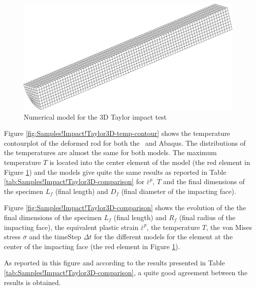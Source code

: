\begin{figure}[h]
\begin{centering}
\includegraphics[width=0.5\columnwidth]{Figures/Samples/Impact/Taylor-3D_mesh}
\par\end{centering}
\caption{Numerical model for the 3D Taylor impact test\label{fig:Samples!Impact!Taylor3D}}
\end{figure}

Figure \ref{fig:Samples!Impact!Taylor3D-temp-contour} shows the temperature
contourplot of the deformed rod for both the \Dynela~and Abaqus.
The distributions of the temperatures are almost the same for both
models. The maximum temperature $T$ is located into the center element
of the model (the red element in Figure \ref{fig:Samples!Impact!Taylor3D})
and the models give quite the same results as reported in Table \ref{tab:Samples!Impact!Taylor3D-comparison}
for $\overline{\varepsilon}^{p}$, $T$ and the final dimensions of
the specimen $L_{f}$ (final length) and $D_{f}$ (final diameter
of the impacting face). 

Figure \ref{fig:Samples!Impact!Taylor3D-comparison} shows the evolution
of the the final dimensions of the specimen $L_{f}$ (final length)
and $R_{f}$ (final radius of the impacting face), the equivalent
plastic strain $\overline{\varepsilon}^{p}$, the temperature $T$,
the von Mises stress $\overline{\sigma}$ and the timeStep $\Delta t$
for the different models for the element at the center of the impacting
face (the red element in Figure \ref{fig:Samples!Impact!Taylor3D}). 

As reported in this figure and according to the results presented
in Table \ref{tab:Samples!Impact!Taylor3D-comparison}, a quite good
agreement between the results is obtained.

